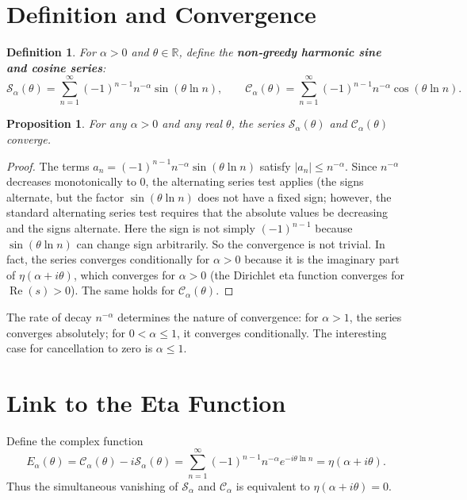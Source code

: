 \documentclass[12pt,a4paper]{article}
\newtheorem{definition}{Definition}
\newtheorem{proposition}{Proposition}
\begin{document}
\section{Definition and Convergence}

\begin{definition}
For $\alpha>0$ and $\theta\in\mathbb{R}$, define the \textbf{non‑greedy harmonic sine and cosine series}:
\[
\mathcal{S}_\alpha(\theta)=\sum_{n=1}^\infty (-1)^{n-1} n^{-\alpha} \sin(\theta\ln n),\qquad
\mathcal{C}_\alpha(\theta)=\sum_{n=1}^\infty (-1)^{n-1} n^{-\alpha} \cos(\theta\ln n).
\]
\end{definition}

\begin{proposition}
For any $\alpha>0$ and any real $\theta$, the series $\mathcal{S}_\alpha(\theta)$ and $\mathcal{C}_\alpha(\theta)$ converge.
\end{proposition}
\begin{proof}
The terms $a_n = (-1)^{n-1} n^{-\alpha} \sin(\theta\ln n)$ satisfy $|a_n| \le n^{-\alpha}$. Since $n^{-\alpha}$ decreases monotonically to $0$, the alternating series test applies (the signs alternate, but the factor $\sin(\theta\ln n)$ does not have a fixed sign; however, the standard alternating series test requires that the absolute values be decreasing and the signs alternate. Here the sign is not simply $(-1)^{n-1}$ because $\sin(\theta\ln n)$ can change sign arbitrarily. So the convergence is not trivial. In fact, the series converges conditionally for $\alpha>0$ because it is the imaginary part of $\eta(\alpha+i\theta)$, which converges for $\alpha>0$ (the Dirichlet eta function converges for $\operatorname{Re}(s)>0$). The same holds for $\mathcal{C}_\alpha(\theta)$.
\end{proof}

The rate of decay $n^{-\alpha}$ determines the nature of convergence: for $\alpha>1$, the series converges absolutely; for $0<\alpha\le1$, it converges conditionally. The interesting case for cancellation to zero is $\alpha\le1$.

\section{Link to the Eta Function}

Define the complex function
\[
E_\alpha(\theta)=\mathcal{C}_\alpha(\theta)-i\mathcal{S}_\alpha(\theta)=\sum_{n=1}^\infty (-1)^{n-1}n^{-\alpha}e^{-i\theta\ln n}=\eta(\alpha+i\theta).
\]
Thus the simultaneous vanishing of $\mathcal{S}_\alpha$ and $\mathcal{C}_\alpha$ is equivalent to $\eta(\alpha+i\theta)=0$.
\end{document}
